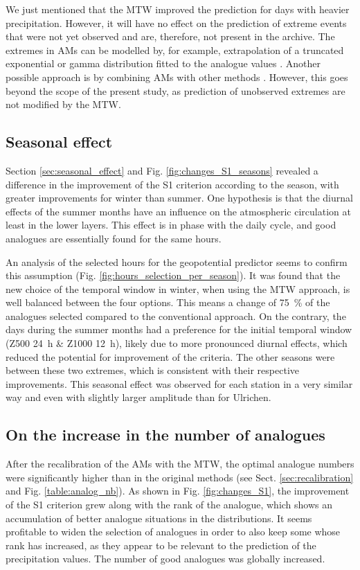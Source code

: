 \documentclass[hess, manuscript]{copernicus}
\begin{document}
	We just mentioned that the MTW improved the prediction for days with heavier precipitation. However, it will have no effect on the prediction of extreme events that were not yet observed and are, therefore, not present in the archive. The extremes in AMs can be modelled by, for example, extrapolation of a truncated exponential or gamma distribution fitted to the analogue values \citep{Obled2002}. Another possible approach is by combining AMs with other methods \citep[e.g.][]{Chardon2014}. However, this goes beyond the scope of the present study, as prediction of unobserved extremes are not modified by the MTW.
	
	
	\subsection{Seasonal effect}
	
	Section \ref{sec:seasonal_effect} and Fig. \ref{fig:changes_S1_seasons} revealed a difference in the improvement of the S1 criterion according to the season, with greater improvements for winter than summer. One hypothesis is that the diurnal effects of the summer months have an influence on the atmospheric circulation at least in the lower layers. This effect is in phase with the daily cycle, and good analogues are essentially found for the same hours.
	
	An analysis of the selected hours for the geopotential predictor seems to confirm this assumption (Fig. \ref{fig:hours_selection_per_season}). It was found that the new choice of the temporal window in winter, when using the MTW approach, is well balanced between the four options. This means a change of 75~\% of the analogues selected compared to the conventional approach. On the contrary, the days during the summer months had a preference for the initial temporal window (Z500 24~h \& Z1000 12~h), likely due to more pronounced diurnal effects, which reduced the potential for improvement of the criteria. The other seasons were between these two extremes, which is consistent with their respective improvements. This seasonal effect was observed for each station in a very similar way and even with slightly larger amplitude than for Ulrichen.
	
	
	\subsection{On the increase in the number of analogues}
	
	After the recalibration of the AMs with the MTW, the optimal analogue numbers were significantly higher than in the original methods (see Sect. \ref{sec:recalibration} and Fig. \ref{table:analog_nb}). As shown in Fig. \ref{fig:changes_S1}, the improvement of the S1 criterion grew along with the rank of the analogue, which shows an accumulation of better analogue situations in the distributions. It seems profitable to widen the selection of analogues in order to also keep some whose rank has increased, as they appear to be relevant to the prediction of the precipitation values. The number of good analogues was globally increased.
	
\end{document}
